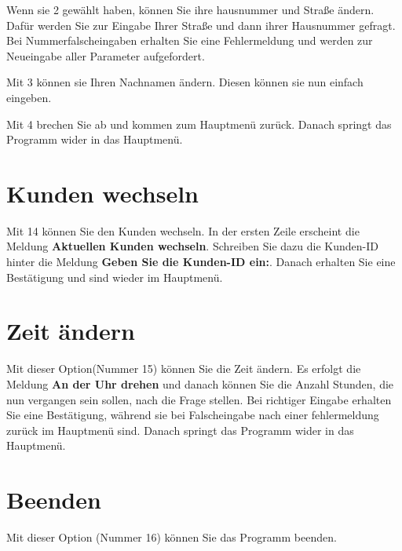 ﻿\documentclass[a4paper,12pt,titlepage]{article}
\newcommand\enquote[1]{{\ttfamily \bfseries #1}}
\begin{document}
Wenn sie 2 gewählt haben, können Sie ihre hausnummer und Straße ändern.
Dafür werden Sie zur Eingabe Ihrer Straße und dann ihrer Hausnummer gefragt.
Bei Nummerfalscheingaben erhalten Sie eine Fehlermeldung und werden zur Neueingabe aller Parameter aufgefordert.

Mit 3 können sie Ihren Nachnamen ändern. Diesen können sie nun einfach eingeben.

Mit 4 brechen Sie ab und kommen zum Hauptmenü zurück.
Danach springt das Programm wider in das Hauptmenü.
\section{Kunden wechseln}
Mit 14 können Sie den Kunden wechseln.
In der ersten Zeile erscheint die Meldung \enquote{Aktuellen Kunden wechseln}.
Schreiben Sie dazu die Kunden-ID hinter die Meldung \enquote{Geben Sie die Kunden-ID ein:}.
Danach erhalten Sie eine Bestätigung und sind wieder im Hauptmenü.

\section{Zeit ändern}
Mit dieser Option(Nummer 15) können Sie die Zeit ändern.
Es erfolgt die Meldung \enquote{An der Uhr drehen} und danach können Sie die Anzahl Stunden,
 die nun vergangen sein sollen, nach die Frage stellen.
Bei richtiger Eingabe erhalten Sie eine Bestätigung,
 während sie bei Falscheingabe nach einer fehlermeldung zurück im Hauptmenü sind.
Danach springt das Programm wider in das Hauptmenü.
\section{Beenden}
Mit dieser Option (Nummer 16) können Sie das Programm beenden.
 
\end{document}
